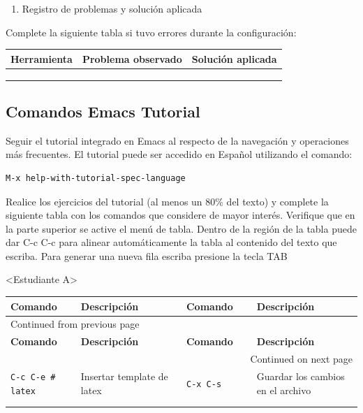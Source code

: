 \documentclass{article}
\begin{document}
\begin{enumerate}
\item Registro de problemas y solución aplicada
\end{enumerate}

Complete la siguiente tabla si tuvo errores durante la configuración:

\begin{center}
\begin{tabularx}{\textwidth}{lXX}
\textbf{Herramienta} & \textbf{Problema observado} & \textbf{Solución aplicada}\\[0pt]
\hline
 &  & \\[0pt]
 &  & \\[0pt]
 &  & \\[0pt]
\end{tabularx}
\end{center}

\subsection{Comandos Emacs Tutorial}
\label{sec:orga0c5688}
Seguir el tutorial integrado en Emacs al respecto de la navegación y
operaciones más frecuentes. El tutorial puede ser accedido en Español
utilizando el comando:

\begin{verbatim}
M-x help-with-tutorial-spec-language
\end{verbatim}

Realice los ejercicios del tutorial (al menos un 80\% del texto) y
complete la siguiente tabla con los comandos que considere de mayor
interés. Verifique que en la parte superior se active el menú de
tabla. Dentro de la región de la tabla puede dar C-c C-c para alinear
automáticamente la tabla al contenido del texto que escriba. Para
generar una nueva fila escriba presione la tecla TAB

<Estudiante A>
\begin{longtable}{|p{0.2\linewidth}|p{0.3\linewidth}|p{0.2\linewidth}|p{0.3\linewidth}|}
\textbf{Comando} & \textbf{Descripción} & \textbf{Comando} & \textbf{Descripción}\\[0pt]
\hline
\endfirsthead
\multicolumn{4}{l}{Continued from previous page} \\[0pt]
\hline

\textbf{Comando} & \textbf{Descripción} & \textbf{Comando} & \textbf{Descripción} \\[0pt]

\hline
\endhead
\hline\multicolumn{4}{r}{Continued on next page} \\
\endfoot
\endlastfoot
\hline
\texttt{C-c C-e \# latex} & Insertar template de  latex & \texttt{C-x C-s} & Guardar los cambios en el archivo\\[0pt]
 &  &  & \\[0pt]
 &  &  & \\[0pt]
\end{longtable}
\end{document}
